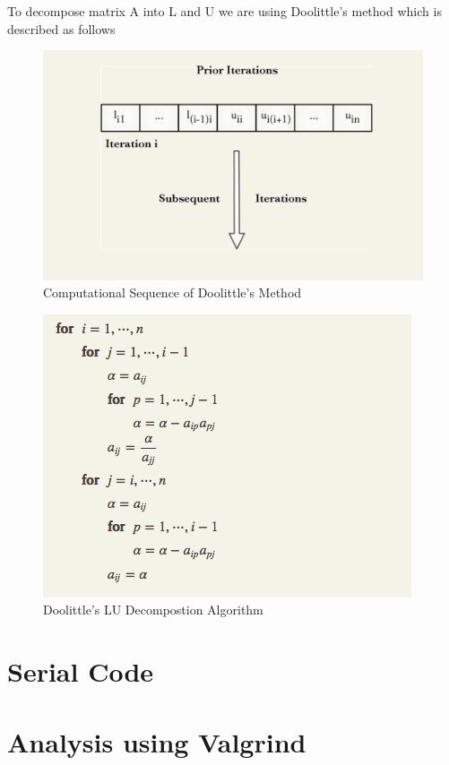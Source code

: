 \documentclass{sem5}
\begin{document}
To decompose matrix A into L and U we are using Doolittle's method which is described as follows
\begin{figure}[htbp]
\centering
\includegraphics[scale=.5]{1.png}
\caption{Computational Sequence of Doolittle's Method}
\end{figure}
\begin{figure}
\centering
\includegraphics[scale=.5]{2.png}
\caption{Doolittle's LU Decompostion Algorithm}
\end{figure}
\newpage
\section{Serial Code}

\section{Analysis using Valgrind}
\end{document}
